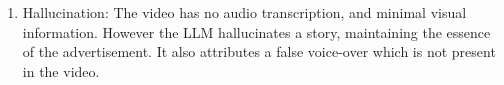 \begin{enumerate}
\begin{enumerate}
            \item Hallucination: The video has no audio transcription, and minimal visual information. However the LLM hallucinates a story, maintaining the essence of the advertisement. It also attributes a false voice-over which is not present in the video.
        \end{enumerate}


    
\end{enumerate}



        
       




    

    


